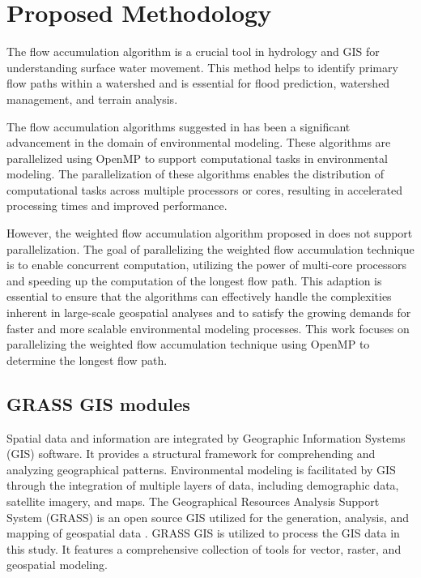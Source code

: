 \documentclass[journal, a4paper]{IEEEtran}
\begin{document}
	\section{Proposed Methodology}
	\label{sec: pm}
	
	The flow accumulation algorithm is a crucial tool in hydrology and GIS for understanding surface water movement. This method helps to identify primary flow paths within a watershed and is essential for flood prediction,	watershed management, and terrain analysis. 
	
	The flow accumulation algorithms suggested in \cite{KOTYRA2021104741, DEJONG2022105083, KOTYRA2023105728, HUANG2022106, KOTYRA2023105613, stojanovic2020accelerating} has been a significant advancement in the domain of environmental modeling. These algorithms are parallelized using OpenMP to support computational tasks in environmental modeling. The parallelization of these algorithms enables the distribution of computational tasks across multiple processors or cores, resulting in accelerated processing times and improved performance.
	
	However, the weighted flow accumulation algorithm proposed in \cite{CHO2020104774} does not support parallelization. The goal of parallelizing the weighted flow accumulation technique is to enable concurrent computation, utilizing the power of multi-core processors and speeding up the computation of the longest flow path. This adaption is essential to ensure that the algorithms can effectively handle the complexities inherent in large-scale geospatial analyses and to satisfy the growing demands for faster and more scalable environmental modeling processes. This work focuses on parallelizing the weighted flow accumulation technique using OpenMP to determine the longest flow path.
	
	\subsection{GRASS GIS modules}
	
	Spatial data and information are integrated by Geographic Information Systems (GIS) software. It provides a structural framework for comprehending and analyzing geographical patterns. Environmental modeling is facilitated by GIS through the integration of multiple layers of data, including demographic data, satellite imagery, and maps. The Geographical Resources Analysis Support System (GRASS) is an open source GIS utilized for the generation, analysis, and mapping of geospatial data \cite{NETELER2012124}. GRASS GIS is utilized to process the GIS data in this study. It features a comprehensive collection of tools for vector, raster, and geospatial modeling.
	
\end{document}
